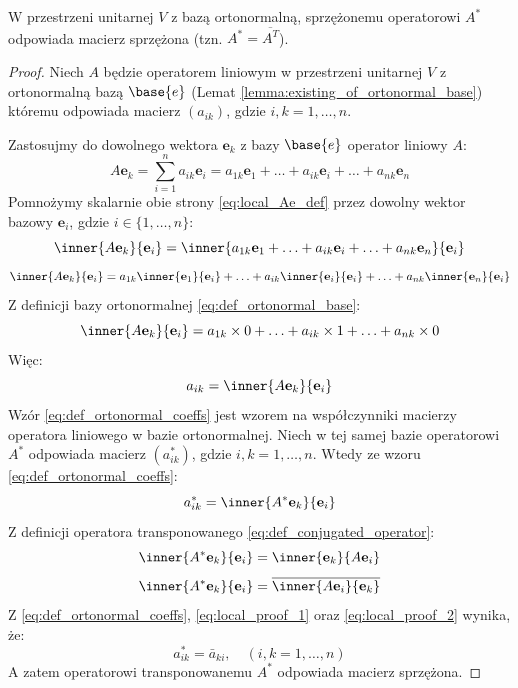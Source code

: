 \begin{theorem}
    W przestrzeni unitarnej $V$ z bazą ortonormalną, sprzężonemu operatorowi $A^*$ odpowiada macierz sprzężona (tzn. $A^* = \overline{A^T}$).
\end{theorem}
\begin{proof}
    Niech $A$ będzie operatorem liniowym w przestrzeni unitarnej $V$ z  ortonormalną bazą $\base{e}$ (Lemat \ref{lemma:existing_of_ortonormal_base}) któremu odpowiada macierz $(a_{ik})$, gdzie $i, k = 1, \ldots, n$.

    Zastosujmy do dowolnego wektora $\mathbf{e}_k$ z bazy $\base{e}$ operator liniowy $A$:
    \begin{equation}\label{eq:local_Ae_def}
        A\mathbf{e}_k = \sum_{i=1}^{n}{a_{ik}\mathbf{e}_i} = a_{1k}\mathbf{e}_1 + \ldots + a_{ik}\mathbf{e}_i + \ldots + a_{nk}\mathbf{e}_n
    \end{equation}
    Pomnożymy skalarnie obie strony \eqref{eq:local_Ae_def} przez dowolny wektor bazowy $\mathbf{e}_i$, gdzie $i \in \{1, \ldots, n\}$:
    $$\inner{A\mathbf{e}_k}{\mathbf{e}_i} = \inner{
        a_{1k}\mathbf{e}_1 + \ldots + a_{ik}\mathbf{e}_i + \ldots + a_{nk}\mathbf{e}_n
    }{\mathbf{e}_i}$$
    $$\inner{A\mathbf{e}_k}{\mathbf{e}_i} = a_{1k}\inner{\mathbf{e}_1}{\mathbf{e}_i} + \ldots + a_{ik}\inner{\mathbf{e}_i}{\mathbf{e}_i} + \ldots + a_{nk}\inner{\mathbf{e}_n}{\mathbf{e}_i}$$
    Z definicji bazy ortonormalnej \eqref{eq:def_ortonormal_base}:
    $$\inner{A\mathbf{e}_k}{\mathbf{e}_i} = a_{1k} \times 0 + \ldots + a_{ik}\times 1 + \ldots + a_{nk} \times 0$$
    Więc:
    \begin{equation}\label{eq:def_ortonormal_coeffs}
        a_{ik} = \inner{A\mathbf{e}_k}{\mathbf{e}_i}
    \end{equation}
    Wzór \eqref{eq:def_ortonormal_coeffs} jest wzorem na współczynniki macierzy operatora liniowego w bazie ortonormalnej.
    Niech w tej samej bazie operatorowi $A^*$ odpowiada macierz $(a^*_{ik})$, gdzie $i, k = 1, \ldots, n$.
    Wtedy ze wzoru \eqref{eq:def_ortonormal_coeffs}:
    \begin{equation}\label{eq:local_proof_1}
        a^*_{ik} = \inner{A^*\mathbf{e}_k}{\mathbf{e}_i}
    \end{equation}
    Z definicji operatora transponowanego \eqref{eq:def_conjugated_operator}:
    $$\inner{A^*\mathbf{e}_k}{\mathbf{e}_i} = \inner{\mathbf{e}_k}{A\mathbf{e}_i}$$
    \begin{equation}\label{eq:local_proof_2}
        \inner{A^*\mathbf{e}_k}{\mathbf{e}_i} = \overline{\inner{A\mathbf{e}_i}{\mathbf{e}_k}}
    \end{equation}
    Z \eqref{eq:def_ortonormal_coeffs}, \eqref{eq:local_proof_1} oraz \eqref{eq:local_proof_2} wynika, że:
    $$a^*_{ik} = \bar{a}_{ki}, \quad (i, k = 1, \ldots, n)$$
    A zatem operatorowi transponowanemu $A^*$ odpowiada macierz sprzężona.
\end{proof}

